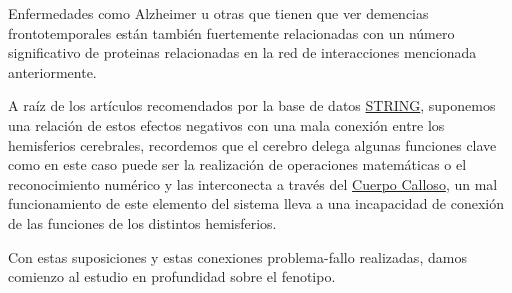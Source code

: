 \hfill

Enfermedades como Alzheimer u otras que tienen que ver demencias frontotemporales están también fuertemente relacionadas con un número significativo de proteinas relacionadas en la red de interacciones mencionada anteriormente.

\hfill

A raíz de los artículos recomendados por la base de datos \href{https://string-db.org/cgi/network?taskId=bhdt20FXsFkM&sessionId=bx1myVptKrEu}{STRING}, suponemos una relación de estos efectos negativos con una mala conexión entre los hemisferios cerebrales, recordemos que el cerebro delega algunas funciones clave como en este caso puede ser la realización de operaciones matemáticas o el reconocimiento numérico y las interconecta a través del \href{https://es.wikipedia.org/wiki/Cuerpo_calloso}{Cuerpo Calloso}, un mal funcionamiento de este elemento del sistema lleva a una incapacidad de conexión de las funciones de los distintos hemisferios.

\hfill

Con estas suposiciones y estas conexiones problema-fallo realizadas, damos comienzo al estudio en profundidad sobre el fenotipo.


